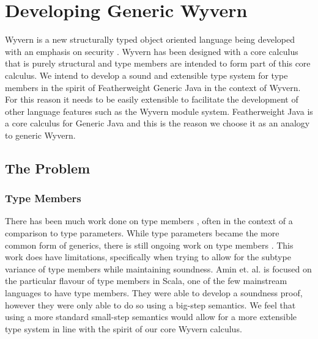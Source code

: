 \documentclass[11pt
              , a4paper
              , twoside
              , openright
              ]{report}
\numberwithin{case}{theorem}
\numberwithin{subcase}{case}
\begin{document}
\section{Developing Generic Wyvern}

Wyvern is a new structurally typed object oriented language being developed with an emphasis on security \cite{Omar2014}. Wyvern has been designed with a core calculus that is purely structural and type members are intended to form part of this core calculus. We intend to develop a sound and extensible type system for type members in the spirit of Featherweight Generic Java \cite{Igarashi:2001:FJM:503502.503505} in the context of Wyvern. For this reason it needs to be easily extensible to facilitate the development of other language features such as the Wyvern module system. Featherweight Java is a core calculus for Generic Java and this is the reason we choose it as an analogy to generic Wyvern.

\subsection{The Problem}

\subsubsection{Type Members}


There has been much work done on type members \cite{Madsen:1989:VCP:74877.74919, Igarashi1999, Thorup97genericityin, Bruce:1998:SSA:646155.679691}, often in the context of a comparison to type parameters. While type parameters became the more common form of generics, there is still ongoing work on type members \cite{Odersky2003, Amin:2014:FPT:2660193.2660216, amin:fool:2012}.  This work does have limitations, specifically when trying to allow for the subtype variance of type members while maintaining soundness. Amin et. al. \cite{Amin:2014:FPT:2660193.2660216, amin:fool:2012} is focused on the particular flavour of type members in Scala, one of the few mainstream languages to have type members. They were able to develop a soundness proof, however they were only able to do so using a big-step semantics. We feel that using a more standard small-step semantics would allow for a more extensible type system in line with the spirit of our core Wyvern calculus.
\end{document}
